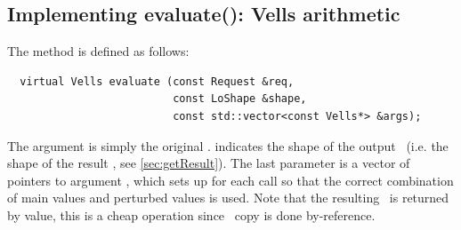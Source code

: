 \subsection{Implementing evaluate(): Vells arithmetic}

  The  method is defined as follows:
  
  \begin{verbatim}  
  virtual Vells evaluate (const Request &req,
                          const LoShape &shape,
                          const std::vector<const Vells*> &args);
  \end{verbatim}
  
  The  argument is simply the original \Request.  indicates
  the shape of the output \Vells\ (i.e. the shape of the result \Cells, see
  \ref{sec:getResult}). The last parameter is a vector of pointers to argument
  \Vells, which  sets up for each call so that the correct
  combination of main values and perturbed values is used. Note that the
  resulting \Vells\ is returned by value, this is a cheap operation since
  \Vells\ copy is done by-reference.

